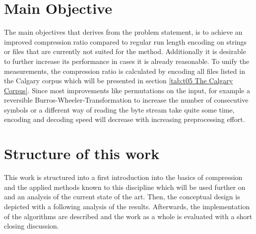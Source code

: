 \section{Main Objective}
\label{ch:Introduction:sec:Main Objective}
\par{
The main objectives that derives from the problem statement, is to achieve an improved compression ratio compared to regular run length encoding on strings or files that are currently not suited for the method. Additionally it is desirable to further increase its performance in cases it is already reasonable. To unify the measurements, the compression ratio is calculated by encoding all files listed in the Calgary corpus which will be presented in section \ref{tab:t05 The Calgary Corpus}. Since most improvements like permutations on the input, for example a reversible Burros-Wheeler-Transformation to increase the number of consecutive symbols or a different way of reading the byte stream take quite some time, encoding and decoding speed will decrease with increasing preprocessing effort.
}
\section{Structure of this work}
\label{ch:Intoduction:sec:Structure}
\par{
This work is structured into a first introduction into the basics of compression and the applied methods known to this discipline which will be used further on and an analysis of the current state of the art. Then, the conceptual design is depicted with a following analysis of the results. Afterwards, the implementation of the algorithms are described and the work as a whole is evaluated with a short closing discussion.  
}
